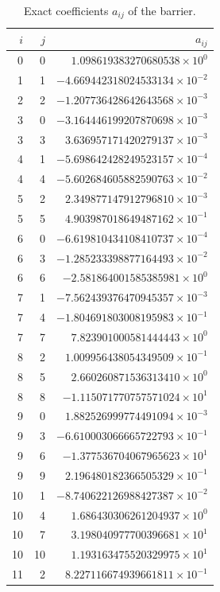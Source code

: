 \documentclass[11pt]{article}
\numberwithin{equation}{section}
\theoremstyle{definition}
\theoremstyle{remark}
\begin{document}
\begingroup
\small
\begin{longtable}{rrr}
\caption{Exact coefficients $a_{ij}$ of the barrier.}\label{cert:barrier-coefficients}\\
\toprule $i$&$j$&$a_{ij}$\\\midrule
\endfirsthead
0 & 0 & $1.098619383270680538\times10^{0}$ \\
1 & 1 & $-4.669442318024533134\times10^{-2}$ \\
2 & 2 & $-1.207736428642643568\times10^{-3}$ \\
3 & 0 & $-3.164446199207870698\times10^{-3}$ \\
3 & 3 & $3.636957171420279137\times10^{-3}$ \\
4 & 1 & $-5.698642428249523157\times10^{-4}$ \\
4 & 4 & $-5.602684605882590763\times10^{-2}$ \\
5 & 2 & $2.349877147912796810\times10^{-3}$ \\
5 & 5 & $4.903987018649487162\times10^{-1}$ \\
6 & 0 & $-6.619810434108410737\times10^{-4}$ \\
6 & 3 & $-1.285233398877164493\times10^{-2}$ \\
6 & 6 & $-2.581864001585385981\times10^{0}$ \\
7 & 1 & $-7.562439376470945357\times10^{-3}$ \\
7 & 4 & $-1.804691803008195983\times10^{-1}$ \\
7 & 7 & $7.823901000581444443\times10^{0}$ \\
8 & 2 & $1.009956438054349509\times10^{-1}$ \\
8 & 5 & $2.660260871536313410\times10^{0}$ \\
8 & 8 & $-1.115071770757571024\times10^{1}$ \\
9 & 0 & $1.882526999774491094\times10^{-3}$ \\
9 & 3 & $-6.610003066665722793\times10^{-1}$ \\
9 & 6 & $-1.377536704067965623\times10^{1}$ \\
9 & 9 & $2.196480182366505329\times10^{-1}$ \\
10 & 1 & $-8.740622126988427387\times10^{-2}$ \\
10 & 4 & $1.686430306261204937\times10^{0}$ \\
10 & 7 & $3.198040977700396681\times10^{1}$ \\
10 & 10 & $1.193163475520329975\times10^{1}$ \\
11 & 2 & $8.227116674939661811\times10^{-1}$ \\

\end{longtable}
\end{document}
